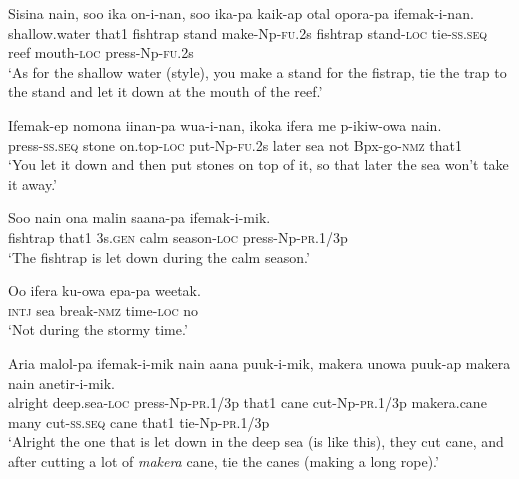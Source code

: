 \ea
\gll  Sisina  nain,  soo  ika  on-i-nan,              soo  ika-pa  kaik-ap  otal  opora-pa              ifemak-i-nan. \\
shallow.water  that1  fishtrap  stand  make-Np-\textsc{fu}.2s  fishtrap  stand-\textsc{loc}  tie-\textsc{ss.seq}  reef  mouth-\textsc{loc}  press-Np-\textsc{fu}.2s \\




\glt ‘As for the shallow water (style), you make a stand for the fistrap, tie the trap to the stand and let it down at the mouth of the reef.’ \\
\z


\ea
\gll  Ifemak-ep  nomona  iinan-pa  wua-i-nan,  ikoka  ifera  me  p-ikiw-owa  nain. \\
press-\textsc{ss.seq}  stone  on.top-\textsc{loc}  put-Np-\textsc{fu}.2s  later  sea    not  Bpx-go-\textsc{nmz}  that1 \\


\glt ‘You let it down and then put stones on top of it, so that later the sea won’t take it away.’ \\
\z


\ea
\gll  Soo  nain  ona  malin  saana-pa  ifemak-i-mik. \\
fishtrap  that1  3s.\textsc{gen}  calm  season-\textsc{loc}  press-Np-\textsc{pr}.1/3p \\
\glt ‘The fishtrap is let down during the calm season.’ \\
\z


\ea
\gll  Oo  ifera  ku-owa  epa-pa  weetak. \\
\textsc{intj}  sea  break-\textsc{nmz}  time-\textsc{loc}  no \\
\glt ‘Not during the stormy time.’ \\
\z


\ea
\gll  Aria  malol-pa  ifemak-i-mik  nain  aana        puuk-i-mik,  makera  unowa  puuk-ap             makera  nain  anetir-i-mik. \\
alright  deep.sea-\textsc{loc}  press-Np-\textsc{pr}.1/3p  that1  cane  cut-Np-\textsc{pr}.1/3p  makera.cane  many  cut-\textsc{ss.seq}   cane  that1  tie-Np-\textsc{pr}.1/3p \\




\glt ‘Alright the one that is let down in the deep sea (is like this), they cut cane, and after cutting a lot of \textit{makera} cane, tie the canes (making a long rope).’ \\
\z


